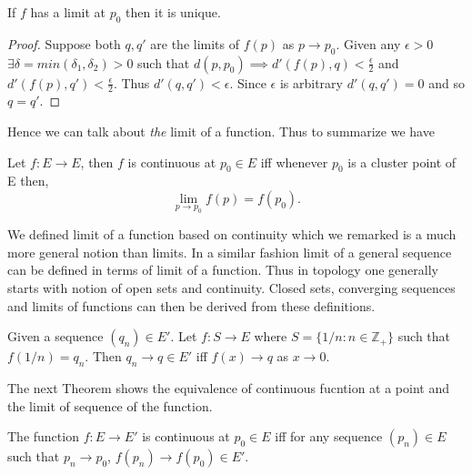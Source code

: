 \begin{Proposition}
    If $f$ has a limit at $p_0$ then it is unique.
\end{Proposition}
\begin{proof}
    Suppose both $q,q'$ are the limits of $f(p)$ as $p \to p_0$. Given any $\epsilon > 0$ $\exists
    \delta = min(\delta_1,\delta_2) > 0 $ such that $d(p,p_0) \implies d'(f(p),q) <
    \frac{\epsilon}{2}$ and $d'(f(p),q') < \frac{\epsilon}{2}$. Thus $d'(q,q') < \epsilon$. Since
    $\epsilon$ is arbitrary $d'(q,q') = 0$ and so $q = q'$.
\end{proof}
Hence we can talk about \emph{the} limit of a function. Thus to summarize we have 
\begin{Theorem}[name=Limit and continuity]
    Let $f : E \to E$, then $f$ is continuous at $p_0 \in E$ iff whenever $p_0$ is a cluster point
    of E then, \[\lim_{p \to p_0} f(p) = f(p_0) .\]
\end{Theorem}
We defined limit of a function based on continuity which we remarked is a much more general notion
than limits. In a similar fashion limit of a general sequence can be defined in terms of limit of
a function. Thus in topology one generally starts with notion of open sets and continuity. Closed
sets, converging sequences and limits of functions can then be derived from these definitions.
\begin{Proposition}
    Given a sequence $\left(q_n\right) \in E'$. Let $f: S \to E$ where $S = \left.\lbrace 1/n : n \in
    \mathbb{Z}_+\rbrace\right.$ such that $f(1/n) = q_n$. Then $q_n \to q \in E'$ 
    iff $f(x) \to q$ as $ x \to 0$.
\end{Proposition}
The next Theorem shows the equivalence of continuous fucntion at a point and the limit of
sequence of the function. 
\begin{Theorem}[name=Continuity and sequences]
    The function $f : E \to E'$ is continuous at $p_0 \in E$ iff for any sequence $\left(p_n\right)
    \in E$ such that $p_n \to p_0$, $f(p_n) \to f(p_0) \in E'$.
\end{Theorem}
